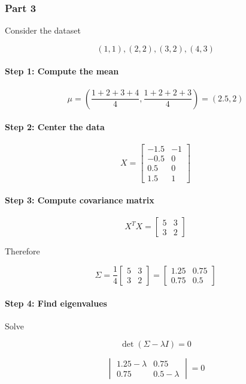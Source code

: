 \documentclass[12pt]{article}
\begin{document}
\subsubsection*{Part 3}

Consider the dataset

\[
(1,1), (2,2), (3,2), (4,3)
\]

\paragraph{Step 1: Compute the mean}

\[
\mu
=
\left(
\frac{1+2+3+4}{4},
\frac{1+2+2+3}{4}
\right)
=
(2.5,2)
\]

\paragraph{Step 2: Center the data}

\[
X=
\begin{bmatrix}
-1.5 & -1 \\
-0.5 & 0 \\
0.5 & 0 \\
1.5 & 1
\end{bmatrix}
\]

\paragraph{Step 3: Compute covariance matrix}

\[
X^TX
=
\begin{bmatrix}
5 & 3 \\
3 & 2
\end{bmatrix}
\]

Therefore

\[
\Sigma
=
\frac14
\begin{bmatrix}
5 & 3 \\
3 & 2
\end{bmatrix}
=
\begin{bmatrix}
1.25 & 0.75 \\
0.75 & 0.5
\end{bmatrix}
\]

\paragraph{Step 4: Find eigenvalues}

Solve

\[
\det(\Sigma-\lambda I)=0
\]

\[
\begin{vmatrix}
1.25-\lambda & 0.75 \\
0.75 & 0.5-\lambda
\end{vmatrix}
=0
\]
\end{document}
